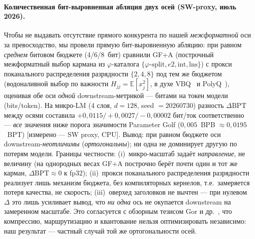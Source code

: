 \documentclass[11pt,a4paper]{article}
\theoremstyle{plain}
\begin{document}
\paragraph{Количественная бит-выровненная абляция двух осей (SW-proxy, июль 2026).}
Чтобы не выдавать отсутствие прямого конкурента по нашей
\emph{межформатной} оси за превосходство, мы провели прямую
бит-выровненную абляцию: при равном \emph{среднем} битовом бюджете
(4/6/8~бит) сравнили GF+A (построчный межформатный выбор кармана из
\(\varphi\)-каталога \(\{\varphi\text{-split}, e2, \text{int}, \text{lns}\}\))
с прокси поканального распределения разрядности \(\{2,4,8\}\) под тем же
бюджетом (водоналивной выбор по важности \(H_{jj}=\mathbb{E}[x_j^2]\), в
духе VBQ~\cite{vbq2026} и PolyQ~\cite{polyq2026}), оценивая обе оси
\emph{одной} downstream-метрикой --- битами на токен модели
(bits/token). На микро-LM (4 слоя, \(d=128\), seed \(=20260730\))
разность \(\Delta\mathrm{BPT}\) между осями составила
\(+0{,}0115 / +0{,}0027 / -0{,}00002\) бит/ток соответственно ---
\emph{все} значения ниже порога значимости Parameter Golf
(\(0{,}005\)~BPB \(\approx 0{,}0195\)~BPT) [измерено --- SW proxy, CPU].
Вывод: при равном бюджете оси downstream-\emph{неотличимы}
(\emph{ортогональны}); ни одна не доминирует другую по потерям модели.
Границы честности: (i)~микро-масштаб задаёт \emph{направление}, не
величину (на однородных весах GF+A построчно берёт почти один и тот же
карман, \(\Delta\mathrm{BPT}\!\approx\!0\) к fp32); (ii)~прокси
поканального распределения разрядности реализует лишь механизм бюджета, без
компиляторных кернелов, т.е.\ замеряется потеря качества, не скорость;
(iii)~оверхед заголовков не вычтен --- при нулевом \(\Delta\) это лишь
усиливает вывод, что \emph{ни одна} ось не окупается downstream на
замеренном масштабе. Это согласуется с обзорным тезисом
Gor и др.~\cite{codesign2026}, что компрессию, маршрутизацию и
квантование нельзя оптимизировать независимо: наш результат ---
частный случай той же ортогональности осей.
\end{document}

